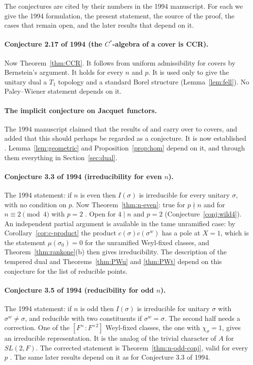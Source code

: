 \documentclass[12pt,letterpaper]{article}
\numberwithin{equation}{section}
\theoremstyle{definition}
\begin{document}
The conjectures are cited by their numbers in the 1994 manuscript.  For each we give the 1994 formulation, the present statement, the source of
the proof, the cases that remain open, and the later results that depend on it.

\paragraph{Conjecture 2.17 of 1994 (the $C^*$-algebra of a cover is CCR).}  Now
Theorem~\ref{thm:CCR}.  It follows from uniform admissibility for covers
\cite[Theorem~3.4]{KS23} by Bernstein's argument.  It holds for every $n$ and $p$.  It is
used only to give the unitary dual a $T_1$ topology and a standard Borel structure
(Lemma~\ref{lem:fell}).  No Paley--Wiener statement depends on it.

\paragraph{The implicit conjecture on Jacquet functors.}  The 1994 manuscript claimed
that the results of \cite{BZ77} and \cite{Ca95} carry over to covers, and added that this
should perhaps be regarded as a conjecture.  It is now established \cite{KS23}.
Lemma~\ref{lem:geometric} and Proposition~\ref{prop:hom} depend on it, and through them
everything in Section~\ref{sec:dual}.

\paragraph{Conjecture 3.3 of 1994 (irreducibility for even $n$).}  The 1994 statement: if $n$ is
even then $I(\sigma)$ is irreducible for every unitary $\sigma$, with no condition on $p$.
Now Theorem~\ref{thm:n-even}: true for $p\nmid n$ \cite{Mo88,GS16} and for
$n\equiv2\pmod4$ with $p=2$ \cite{Sz19}.  Open for $4\mid n$ and $p=2$
(Conjecture~\ref{conj:wild4}).  An independent partial argument is available in the tame
unramified case: by Corollary~\ref{cor:c-product} the product $c(\sigma)c(\sigma^w)$ has a
pole at $X=1$, which is the statement $\mu(\sigma_0)=0$ for the unramified Weyl-fixed
classes, and Theorem~\ref{thm:rankone}(b) then gives irreducibility.  The description of the
tempered dual and Theorems~\ref{thm:PWu} and \ref{thm:PWt} depend on this conjecture for
the list of reducible points.

\paragraph{Conjecture 3.5 of 1994 (reducibility for odd $n$).}  The 1994 statement: if $n$ is odd
then $I(\sigma)$ is irreducible for unitary $\sigma$ with $\sigma^w\ne\sigma$, and reducible
with two constituents if $\sigma^w=\sigma$.  The second half needs a correction.  One of the
$[F^\times:F^{\times2}]$ Weyl-fixed classes, the one with $\chi_\sigma=1$, gives an
irreducible representation.  It is the analog of the trivial character of $A$ for
$SL(2,F)$.  The corrected statement is Theorem~\ref{thm:n-odd-conj}, valid for every $p$
\cite{Sz19,Sz24,Lu20}.  The same later results depend on it as for Conjecture 3.3 of 1994.
\end{document}
